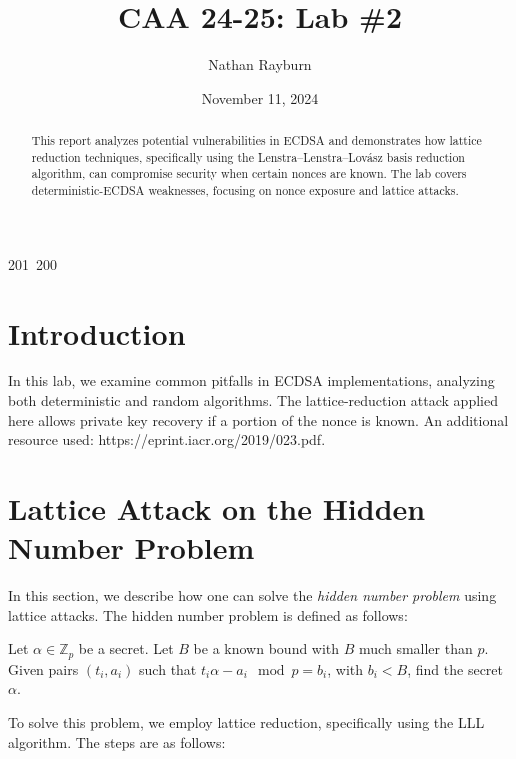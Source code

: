 201~200~\documentclass{article}
\title{CAA 24-25: Lab \#2}
\author{Nathan Rayburn}
\date{November 11, 2024}
\begin{document}
	                                                                \maketitle

	                                                                \begin{abstract}
	                                                                This report analyzes potential vulnerabilities in ECDSA and demonstrates how lattice reduction techniques, specifically using the Lenstra–Lenstra–Lovász basis reduction algorithm, can compromise security when certain nonces are known. The lab covers deterministic-ECDSA weaknesses, focusing on nonce exposure and lattice attacks.
	                                                                \end{abstract}

	                                                                \section{Introduction}
	                                                                In this lab, we examine common pitfalls in ECDSA implementations, analyzing both deterministic and random algorithms. The lattice-reduction attack applied here allows private key recovery if a portion of the nonce is known. An additional resource used: https://eprint.iacr.org/2019/023.pdf.

	                                                                \section{Lattice Attack on the Hidden Number Problem}
	                                                                In this section, we describe how one can solve the \textit{hidden number problem} using lattice attacks. The hidden number problem is defined as follows:

	                                                                Let $\alpha \in \mathbb{Z}_p$ be a secret. Let $B$ be a known bound with $B$ much smaller than $p$. Given pairs $(t_i, a_i)$ such that $t_i \alpha - a_i \mod p = b_i$, with $b_i < B$, find the secret $\alpha$.

	                                                                To solve this problem, we employ lattice reduction, specifically using the LLL algorithm. The steps are as follows:
\end{document}
